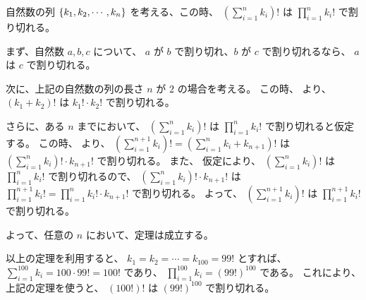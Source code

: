 \begin{Theorem}
  自然数の列 $\left\{ k_1, k_2, \cdots, k_n \right\}$ を考える、この時、
  $\left( \sum_{i=1}^{n} k_i \right) !$ は
  $\prod_{i=1}^{n} k_i !$ で割り切れる。
\end{Theorem}
\begin{Proof}
  まず、自然数 $a,b,c$ について、
  $a$ が $b$ で割り切れ、$b$ が $c$ で割り切れるなら、
  $a$ は $c$ で割り切れる。

  次に、上記の自然数の列の長さ $n$ が $2$ の場合を考える。
  この時、 より、
  $(k_1 + k_2)!$ は $k_1! \cdot k_2!$ で割り切れる。

  さらに、ある $n$ までにおいて、
  $\left( \sum_{i=1}^{n} k_i \right) !$ は
  $\prod_{i=1}^{n} k_i !$ で割り切れると仮定する。
  この時、
   より、
  $\left( \sum_{i=1}^{n+1} k_i \right) ! =
   \left( \sum_{i=1}^{n} k_i + k_{n+1}\right) ! $ は
  $\left( \sum_{i=1}^{n} k_i \right) ! \cdot k_{n+1}!$ で割り切れる。
  また、
  仮定により、
  $\left( \sum_{i=1}^{n} k_i \right) ! $ は
  $\prod_{i=1}^{n} k_i !$ で割り切れるので、
  $\left( \sum_{i=1}^{n} k_i \right) ! \cdot k_{n+1}!$ は
  $\prod_{i=1}^{n+1} k_i ! = \prod_{i=1}^{n} k_i ! \cdot k_{n+1}!$ で割り切れる。
  よって、
  $\left( \sum_{i=1}^{n+1} k_i \right) !$ は
  $\prod_{i=1}^{n+1} k_i ! $ で割り切れる。

  よって、任意の $n$ において、定理は成立する。
\end{Proof}

以上の定理を利用すると、
$k_1 = k_2 = \cdots = k_{100} = 99!$ とすれば、
$\sum_{i=1}^{100} k_i = 100 \cdot 99! = 100!$ であり、
$\prod_{i=1}^{100} k_i = (99!)^{100} $ である。
これにより、上記の定理を使うと、
$(100!)!$ は $(99!)^{100}$ で割り切れる。
\QED



